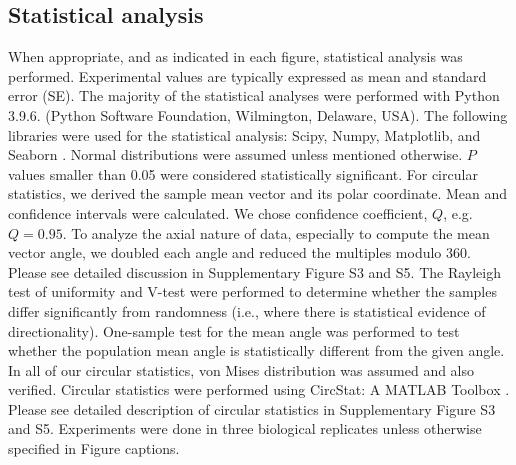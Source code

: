 \documentclass[review]{elsarticle}
\begin{document}
\subsection{Statistical analysis}
When appropriate, and as indicated in each figure, statistical analysis was performed. Experimental values are typically expressed as mean and standard error (SE). The majority of the statistical analyses were performed with Python 3.9.6. (Python Software Foundation, Wilmington, Delaware, USA). The following libraries were used for the statistical analysis: Scipy, Numpy, Matplotlib, and Seaborn \cite{5725236, hunter2007,Virtanen2020}. Normal distributions were assumed unless mentioned otherwise. $P$ values smaller than 0.05 were considered statistically significant. For circular statistics, we derived the sample mean vector and its polar coordinate. Mean and confidence intervals were calculated. We chose confidence coefficient, $Q$, e.g. $Q = 0.95$. To analyze the axial nature of data, especially to compute the mean vector angle, we doubled each angle and reduced the multiples modulo 360\degree. Please see detailed discussion in Supplementary Figure S3 and S5. The Rayleigh test of uniformity and V-test were performed to determine whether the samples differ significantly from randomness (i.e., where there is statistical evidence of directionality). One-sample test for the mean angle was performed to test whether the population mean angle is statistically different from the given angle. In all of our circular statistics, von Mises distribution was assumed and also verified. Circular statistics were performed using CircStat: A MATLAB Toolbox \cite{Berens2009, Berens2009a}. Please see detailed description of circular statistics in Supplementary Figure S3 and S5. Experiments were done in three biological replicates unless otherwise specified in Figure captions.



\end{document}
